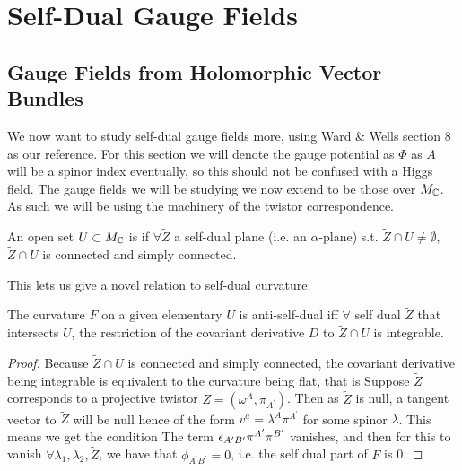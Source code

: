 \documentclass{article}
\begin{document}
\section{Self-Dual Gauge Fields}
\subsection{Gauge Fields from Holomorphic Vector Bundles}
We now want to study self-dual gauge fields more, using Ward \& Wells section 8 as our reference. For this section we will denote the gauge potential as $\Phi$ as $A$ will be a spinor index eventually, so this should not be confused with a Higgs field. The gauge fields we will be studying we now extend to be those over $M_{\mathbb{C}}$. As such we will be using the machinery of the twistor correspondence. 
\begin{definition}
	An open set $U \subset M_{\mathbb{C}}$ is  if $\forall \tilde{Z}$ a self-dual plane (i.e. an $\alpha$-plane) s.t. $\tilde{Z} \cap U \neq \emptyset$, $\tilde{Z} \cap U$ is connected and simply connected. 
\end{definition}
This lets us give a novel relation to self-dual curvature:
\begin{prop}
	The curvature $F$ on a given elementary $U$ is anti-self-dual iff $\forall$ self dual $\tilde{Z}$ that intersects $U$, the restriction of the covariant derivative $D$ to $\tilde{Z} \cap U$ is integrable. 
\end{prop}
\begin{proof}
	Because $\tilde{Z} \cap U$ is connected and simply connected, the covariant derivative being integrable is equivalent to the curvature being flat, that is 
Suppose $\tilde{Z}$ corresponds to a projective twistor $Z = (\omega^A, \pi_{A^\prime})$. Then as $\tilde{Z}$ is null, a tangent vector to $\tilde{Z}$ will be null hence of the form $v^a = \lambda^A \pi^{A^\prime}$ for some spinor $\lambda$. This means we get the condition 
The term $\epsilon_{A^\prime B^\prime}\pi^{A^\prime} \pi^{B^\prime}$ vanishes, and then for this to vanish $\forall \lambda_1, \lambda_2, \tilde{Z}$, we have that $\phi_{A^\prime B^\prime}=0$, i.e. the self dual part of $F$ is 0. 
\end{proof}
\end{document}
